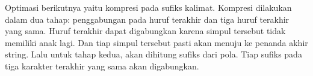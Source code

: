     Optimasi berikutnya yaitu kompresi pada sufiks kalimat. Kompresi dilakukan dalam dua tahap: penggabungan pada huruf terakhir dan tiga huruf terakhir yang sama. Huruf terakhir dapat digabungkan karena simpul tersebut tidak memiliki anak lagi. Dan tiap simpul tersebut pasti akan menuju ke penanda akhir string. Lalu untuk tahap kedua, akan dihitung sufiks dari pola. Tiap sufiks pada tiga karakter terakhir yang sama akan digabungkan.
    


